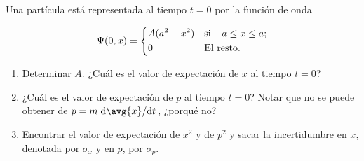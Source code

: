 \documentclass[./../main.tex]{subfiles}
\begin{document}
    \section{}

    Una partícula está representada al tiempo \(t = 0\) por la función de onda

    \begin{equation*}
        \Psi(0, x) = 
        \begin{dcases*}
            A(a^{2} - x^{2}) & si \(-a \leq x \leq a\);\\
            0 & El resto.
        \end{dcases*}
    \end{equation*}

    \begin{enumerate}
        \item Determinar \(A\). ¿Cuál es el valor de expectación de \(x\) al tiempo \(t = 0\)?
        \item ¿Cuál es el valor de expectación de \(p\) al tiempo \(t = 0\)? Notar que no se puede obtener de \(p = m\odv[style-frac-/=\slashfrac]{\avg{x}}/{t}\), ¿porqué no?
        \item Encontrar el valor de expectación de \(x^{2}\) y de \(p^{2}\) y sacar la incertidumbre en \(x\), denotada por \(\sigma_{x}\) y en \(p\), por \(\sigma_{p}\).
    \end{enumerate}
\end{document}
